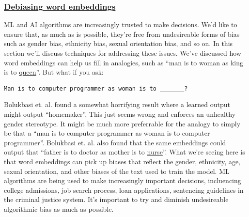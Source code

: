 \documentclass[12pt]{article}
\begin{document}
\subsubsection{\href{https://papers.nips.cc/paper/6228-man-is-to-computer-programmer-as-woman-is-to-homemaker-debiasing-word-embeddings.pdf}{Debiasing     word embeddings}}
ML and AI algorithms are increasingly trusted to make decisions. We'd like to ensure that, as much as is possible, they're free from undesireable forms of bias such as gender bias, ethnicity bias, sexual orientation bias, and so on. In this section we'll discuss techniques for addressing these issues. We've discussed how word embeddings can help us fill in analogies, such as ``man is to woman as king is to \ul{queen}''.
But what if you ask:

\begin{verbatim}
Man is to computer programmer as woman is to _______?
\end{verbatim}

Bolukbasi et. al. found a somewhat horrifying result where a learned output might output ``homemaker''. This just seems wrong and enforces an unhealthy gender stereotype. It might be much more preferrable for the analogy to simply be that a ``man is to computer programmer as woman is to computer programmer''. Bolukbasi et. al. also found that the same embeddings could output that ``father is to doctor as mother is to \ul{nurse}''. What we're seeing here is that word embeddings can pick up biases that reflect the gender, ethnicity, age, sexual orientation, and other biases of the text used to train the model. ML algorithms are being used to make increasingly important decisions, incluencing college admissions, job search process, loan applications, sentencing guidelines in the criminal justice system. It's important to try and diminish undesireable algorithmic bias as much as possible.
\end{document}
